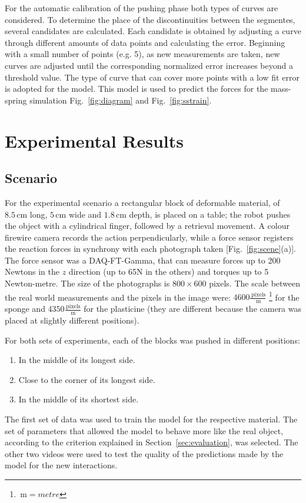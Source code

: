 \documentclass[journal]{IEEEtran}
\newcommand{\fref}[1]{Fig.~\ref{#1}}
\newcommand{\sref}[1]{Section~\ref{#1}}
\newcommand{\unit}[1]{\ensuremath{\, \mathrm{#1}}}
\begin{document}
For the automatic calibration of the pushing phase both types of curves are considered.  To determine the place of the discontinuities between the segmentes, several candidates are calculated.  Each candidate is obtained by adjusting a curve through different amounts of data points and calculating the error.  Beginning with a small number of points (e.g. 5), as new measurements are taken, new curves are adjusted until the corresponding normalized error increases beyond a threshold value.  The type of curve that can cover more points with a low fit error is adopted for the model.  This model is used to predict the forces for the mass-spring simulation \fref{fig:diagram} and \fref{fig:sstrain}.%

\section{Experimental Results}
\label{sec:experiments}
\subsection{Scenario}
For the experimental scenario a rectangular block of deformable material, of $8.5 \unit{cm}$ long, $5 \unit{cm}$ wide and $1.8 \unit{cm}$ depth, is placed on a table; the robot pushes the object with a cylindrical finger, followed by a retrieval movement.  A colour firewire camera records the action perpendicularly, while a force sensor registers the reaction forces in synchrony with each photograph taken [\fref{fig:scene}(a)].  The force sensor was a DAQ-FT-Gamma, that can measure forces up to 200 Newtons in the $z$ direction (up to 65N in the others) and torques up to 5 Newton-metre.  The size of the photographs is $800 \times 600$ pixels.  The scale between the real world measurements and the pixels in the image were: $4600\frac{\unit{pixels}}{\unit{m}}$ \footnote{$\unit{m}=metre$} for the sponge and $4350\frac{\unit{pixels}}{\unit{m}}$ for the plasticine (they are different because the camera was placed at slightly different positions).

For both sets of experiments, each of the blocks was pushed in different positions:
\begin{enumerate}
 \item In the middle of its longest side.
 \item Close to the corner of its longest side.
 \item In the middle of its shortest side.
\end{enumerate}
The first set of data was used to train the model for the respective material.  The set of parameters that allowed the model to behave more like the real object, according to the criterion explained in \sref{sec:evaluation}, was selected.  The other two videos were used to test the quality of the predictions made by the model for the new interactions.
\end{document}
